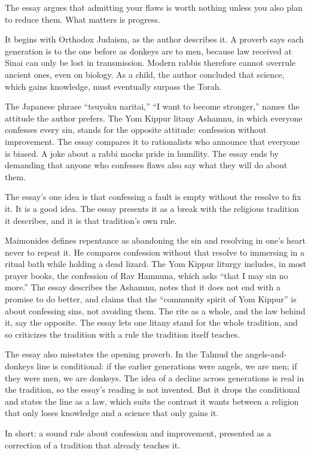 \begin{afterword}
\summaryhead

The essay argues that admitting your flaws is worth nothing unless you also plan to reduce them. What matters is progress.

It begins with Orthodox Judaism, as the author describes it. A proverb says each generation is to the one before as donkeys are to men, because law received at Sinai can only be lost in transmission. Modern rabbis therefore cannot overrule ancient ones, even on biology. As a child, the author concluded that science, which gains knowledge, must eventually surpass the Torah.

The Japanese phrase ``tsuyoku naritai,'' ``I want to become stronger,'' names the attitude the author prefers. The Yom Kippur litany Ashamnu, in which everyone confesses every sin, stands for the opposite attitude: confession without improvement. The essay compares it to rationalists who announce that everyone is biased. A joke about a rabbi mocks pride in humility. The essay ends by demanding that anyone who confesses flaws also say what they will do about them.

\responsehead

The essay's one idea is that confessing a fault is empty without the resolve to fix it. It is a good idea. The essay presents it as a break with the religious tradition it describes, and it is that tradition's own rule.

Maimonides defines repentance as abandoning the sin and resolving in one's heart never to repeat it. He compares confession without that resolve to immersing in a ritual bath while holding a dead lizard. The Yom Kippur liturgy includes, in most prayer books, the confession of Rav Hamnuna, which asks ``that I may sin no more.'' The essay describes the Ashamnu, notes that it does not end with a promise to do better, and claims that the ``community spirit of Yom Kippur'' is about confessing sins, not avoiding them. The rite as a whole, and the law behind it, say the opposite. The essay lets one litany stand for the whole tradition, and so criticizes the tradition with a rule the tradition itself teaches.

The essay also misstates the opening proverb. In the Talmud the angels-and-donkeys line is conditional: if the earlier generations were angels, we are men; if they were men, we are donkeys. The idea of a decline across generations is real in the tradition, so the essay's reading is not invented. But it drops the conditional and states the line as a law, which suits the contrast it wants between a religion that only loses knowledge and a science that only gains it.

In short: a sound rule about confession and improvement, presented as a correction of a tradition that already teaches it.
\end{afterword}
